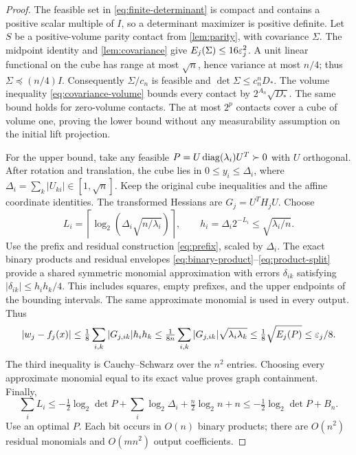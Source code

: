 \begin{proof}
The feasible set in \eqref{eq:finite-determinant} is compact and contains
a positive scalar multiple of $I$, so a determinant maximizer is positive
definite. Let $S$ be a positive-volume parity contact from
\cref{lem:parity}, with covariance $\Sigma$. The midpoint identity and
\cref{lem:covariance} give
$E_j(\Sigma)\le16\varepsilon_j^2$. A unit linear functional on the cube has
range at most $\sqrt n$, hence variance at most $n/4$; thus
$\Sigma\preceq(n/4)I$. Consequently $\Sigma/c_n$ is feasible and
$\det\Sigma\le c_n^nD_*$. The volume inequality
\eqref{eq:covariance-volume} bounds every contact by
$2^{A_n}\sqrt{D_*}$. The same bound holds for zero-volume contacts.
The at most $2^p$ contacts cover a cube of volume one, proving the lower
bound without any measurability assumption on the initial lift projection.

For the upper bound, take any feasible
$P=U\operatorname{diag}(\lambda_i)U^T\succ0$ with $U$ orthogonal. After rotation and
translation, the cube lies in $0\le y_i\le \Delta_i$, where
$\Delta_i=\sum_k|U_{ki}|\in[1,\sqrt n]$. Keep the original cube inequalities
and the affine coordinate identities. The transformed Hessians are
$G_j=U^TH_jU$. Choose
\begin{equation}\label{eq:covariance-grid}
 L_i=\left\lceil\log_2\!\left(\Delta_i\sqrt{n/\lambda_i}\right)\right\rceil,
 \qquad h_i=\Delta_i2^{-L_i}\le\sqrt{\lambda_i/n}.
\end{equation}
Use the prefix and residual construction \eqref{eq:prefix}, scaled by
$\Delta_i$. The exact binary products and residual envelopes
\eqref{eq:binary-product}--\eqref{eq:product-split} provide a shared
symmetric monomial approximation with errors $\delta_{ik}$ satisfying
$|\delta_{ik}|\le h_ih_k/4$. This includes squares, empty prefixes,
and the upper endpoints of the bounding intervals. The same approximate
monomial is used in every output. Thus
\[
 |w_j-f_j(x)|\le\tfrac18\sum_{i,k}|G_{j,ik}|h_ih_k
 \le\tfrac1{8n}\sum_{i,k}|G_{j,ik}|\sqrt{\lambda_i\lambda_k}
 \le\tfrac18\sqrt{E_j(P)}\le\varepsilon_j/8.
\]
The third inequality is Cauchy--Schwarz over the $n^2$ entries.
Choosing every approximate monomial equal to its exact value
proves graph containment. Finally,
\[
 \sum_i L_i\le-\tfrac12\log_2\det P
          +\sum_i\log_2\Delta_i+\tfrac n2\log_2n+n
 \le-\tfrac12\log_2\det P+B_n.
\]
Use an optimal $P$. Each bit occurs in $O(n)$ binary products; there
are $O(n^2)$ residual monomials and $O(mn^2)$ output coefficients.
\end{proof}

